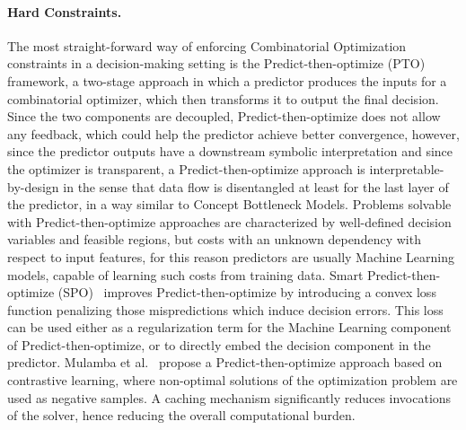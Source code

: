 \paragraph{Hard Constraints.}
The most straight-forward way of enforcing Combinatorial Optimization constraints in a decision-making setting is the Predict-then-optimize (PTO)~\cite{el2019generalization} framework, a two-stage approach in which a predictor produces the inputs for a combinatorial optimizer, which then transforms it to output the final decision. Since the two components are decoupled, Predict-then-optimize does not allow any feedback, which could help the predictor achieve better convergence, however, since the predictor outputs have a downstream symbolic interpretation and since the optimizer is transparent, a Predict-then-optimize approach is interpretable-by-design in the sense that data flow is disentangled at least for the last layer of the predictor, in a way similar to Concept Bottleneck Models.
%
Problems solvable with Predict-then-optimize approaches are characterized by well-defined decision variables and feasible regions, but costs with an unknown dependency with respect to input features, for this reason predictors are usually Machine Learning models, capable of learning such costs from training data.
%
Smart Predict-then-optimize (SPO)~\cite{elmachtoub2022smart} improves Predict-then-optimize by introducing a convex loss function penalizing those mispredictions which induce decision errors. This loss can be used either as a regularization term for the Machine Learning component of Predict-then-optimize, or to directly embed the decision component in the predictor.%
%
Mulamba et al.~\cite{mulamba2020contrastive} propose a Predict-then-optimize approach based on contrastive learning, where non-optimal solutions of the optimization problem are used as negative samples. A caching mechanism significantly reduces invocations of the solver, hence reducing the overall computational burden.

